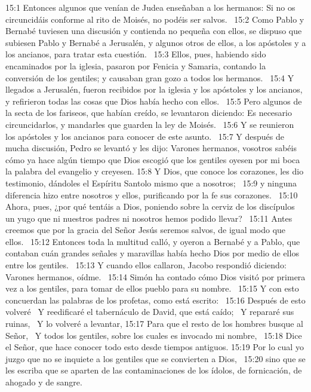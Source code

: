 15:1 Entonces algunos que venían de Judea enseñaban a los hermanos: Si no os circuncidáis conforme al rito de Moisés, no podéis ser salvos.  
15:2 Como Pablo y Bernabé tuviesen una discusión y contienda no pequeña con ellos, se dispuso que subiesen Pablo y Bernabé a Jerusalén, y algunos otros de ellos, a los apóstoles y a los ancianos, para tratar esta cuestión.  
15:3 Ellos, pues, habiendo sido encaminados por la iglesia, pasaron por Fenicia y Samaria, contando la conversión de los gentiles; y causaban gran gozo a todos los hermanos.  
15:4 Y llegados a Jerusalén, fueron recibidos por la iglesia y los apóstoles y los ancianos, y refirieron todas las cosas que Dios había hecho con ellos.  
15:5 Pero algunos de la secta de los fariseos, que habían creído, se levantaron diciendo: Es necesario circuncidarlos, y mandarles que guarden la ley de Moisés.  
15:6 Y se reunieron los apóstoles y los ancianos para conocer de este asunto.  
15:7 Y después de mucha discusión, Pedro se levantó y les dijo: Varones hermanos, vosotros sabéis cómo ya hace algún tiempo que Dios escogió que los gentiles oyesen por mi boca la palabra del evangelio y creyesen. 
15:8 Y Dios, que conoce los corazones, les dio testimonio, dándoles el Espíritu Santolo mismo que a nosotros; 
15:9 y ninguna diferencia hizo entre nosotros y ellos, purificando por la fe sus corazones.  
15:10 Ahora, pues, ¿por qué tentáis a Dios, poniendo sobre la cerviz de los discípulos un yugo que ni nuestros padres ni nosotros hemos podido llevar?  
15:11 Antes creemos que por la gracia del Señor Jesús seremos salvos, de igual modo que ellos.  
15:12 Entonces toda la multitud calló, y oyeron a Bernabé y a Pablo, que contaban cuán grandes señales y maravillas había hecho Dios por medio de ellos entre los gentiles.  
15:13 Y cuando ellos callaron, Jacobo respondió diciendo: Varones hermanos, oídme.  
15:14 Simón ha contado cómo Dios visitó por primera vez a los gentiles, para tomar de ellos pueblo para su nombre.  
15:15 Y con esto concuerdan las palabras de los profetas, como está escrito:  
15:16 Después de esto volveré  
Y reedificaré el tabernáculo de David, que está caído;  
Y repararé sus ruinas,  
Y lo volveré a levantar, 
15:17 Para que el resto de los hombres busque al Señor,  
Y todos los gentiles, sobre los cuales es invocado mi nombre,  
15:18 Dice el Señor, que hace conocer todo esto desde tiempos antiguos. 
15:19 Por lo cual yo juzgo que no se inquiete a los gentiles que se convierten a Dios,  
15:20 sino que se les escriba que se aparten de las contaminaciones de los ídolos, de fornicación, de ahogado y de sangre. 
